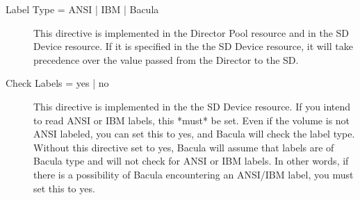 \begin{description}
\item [ Label Type = ANSI | IBM | Bacula]  
  This directive is implemented in the Director Pool resource and in the SD Device
  resource.  If it is specified in the the SD Device resource, it will take
  precedence over the value passed from the Director to the SD.
 
\item [Check Labels = yes | no]
  This directive is implemented in the the SD Device resource.  If you intend
  to read ANSI or IBM labels, this *must* be set.  Even if the volume is
  not ANSI labeled, you can set this to yes, and Bacula will check the
  label type. Without this directive set to yes, Bacula will assume that
  labels are of Bacula type and will not check for ANSI or IBM labels.
  In other words, if there is a possibility of Bacula encountering an
  ANSI/IBM label, you must set this to yes.
\end{description}
